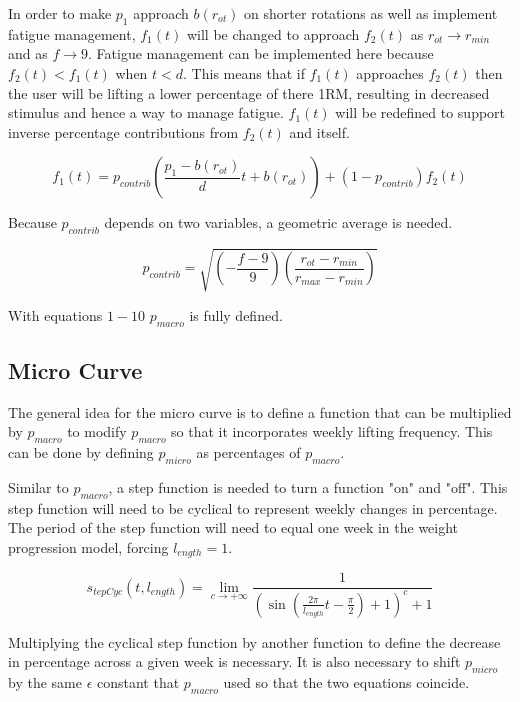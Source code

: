 In order to make $p_1$ approach $b(r_{ot})$ on shorter rotations as well as implement fatigue management, $f_1(t)$ will be changed to approach $f_2(t)$ as $r_{ot}\to r_{min}$ and as $f\to 9$. Fatigue management can be implemented here because $f_2(t)<f_1(t)$ when $t<d$. This means that if $f_1(t)$ approaches $f_2(t)$ then the user will be lifting a lower percentage of there 1RM, resulting in decreased stimulus and hence a way to manage fatigue. $f_1(t)$ will be redefined to support inverse percentage contributions from $f_2(t)$ and itself.

\begin{equation}
    f_1(t)=p_{contrib}\left (\frac{p_1-b(r_{ot})}{d}t+b(r_{ot}) \right)+
           (1-p_{contrib})f_2(t)
\end{equation}

Because $p_{contrib}$ depends on two variables, a geometric average is needed.

\begin{equation}
    p_{contrib}=\sqrt{\left( -\frac{f-9}{9} \right)
                      \left( \frac{r_{ot}-r_{min}}{r_{max}-r_{min}} \right)}
\end{equation}

With equations $1-10$ $p_{macro}$ is fully defined.

\subsection{Micro Curve}
The general idea for the micro curve is to define a function that can be multiplied by $p_{macro}$ to modify $p_{macro}$ so that it incorporates weekly lifting frequency. This can be done by defining $p_{micro}$ as percentages of $p_{macro}$.

Similar to $p_{macro}$, a step function is needed to turn a function "on" and "off". This step function will need to be cyclical to represent weekly changes in percentage. The period of the step function will need to equal one week in the weight progression model, forcing $l_{ength}=1$.

\begin{equation}
    s_{tepCyc}(t,l_{ength})=
        \lim_{c \to +\infty}
        \frac{1}{\left( \sin\left( \frac{2\pi}{l_{ength}}t-\frac{\pi}{2} \right) +1 \right)^c+1}
\end{equation}

Multiplying the cyclical step function by another function to define the decrease in percentage across a given week is necessary. It is also necessary to shift $p_{micro}$ by the same $\epsilon$ constant that $p_{macro}$ used so that the two equations coincide.

